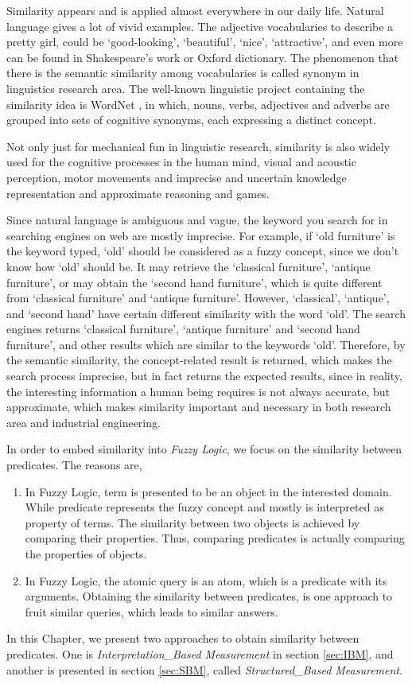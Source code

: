 Similarity appears and is applied almost everywhere in our daily life. Natural language gives a lot of vivid examples. The adjective vocabularies to describe a pretty girl, could be `good-looking', `beautiful', `nice', `attractive', and even more can be found in Shakespeare's work or Oxford dictionary. The phenomenon that there is the semantic similarity among vocabularies is called synonym in linguistics research area. The well-known linguistic project containing the similarity idea is WordNet \cite{Fel98}, in which, nouns, verbs, adjectives and adverbs are grouped into sets of cognitive synonyms, each expressing a distinct concept. 

Not only just for mechanical fun in linguistic research, similarity is also widely used for the cognitive processes in the human mind, visual and acoustic perception, motor movements and imprecise and uncertain knowledge representation and approximate reasoning and games.

Since natural language is ambiguous and vague, the keyword you search for in searching engines on web are mostly imprecise. For example, if `old furniture' is the keyword typed, `old' should be considered as a fuzzy concept, since we don't know how `old' should be. It may retrieve the `classical furniture', `antique furniture', or may obtain the `second hand furniture', which is quite different from `classical furniture' and `antique furniture'. However, `classical', `antique', and `second hand' have certain different similarity with the word `old'. The search engines returns `classical furniture', `antique furniture' and `second hand furniture', and other results which are similar to the keywords `old'. Therefore, by the semantic similarity, the concept-related result is returned, which makes the search process imprecise, but in fact returns the expected results, since in reality, the interesting information a human being requires is not always accurate, but approximate, which makes similarity important and necessary in both research area and industrial engineering. 

In order to embed similarity into \textit{Fuzzy Logic}, we focus on the similarity between predicates. The reasons are,

\begin{enumerate}
\item In Fuzzy Logic, term is presented to be an object in the interested domain. While predicate represents the fuzzy concept and mostly is interpreted as property of terms. The similarity between two objects is achieved by comparing their properties. Thus, comparing predicates is actually comparing the properties of objects.

\item In Fuzzy Logic, the atomic query is an atom, which is a predicate with its arguments. Obtaining the similarity between predicates,  is one approach to fruit similar queries, which leads to similar answers.
\end{enumerate}

In this Chapter, we present two approaches to obtain similarity between predicates. One is \textit{Interpretation\_Based Measurement} in section \ref{sec:IBM}, and another is presented in section \ref{sec:SBM}, called \textit{Structured\_Based Measurement}.